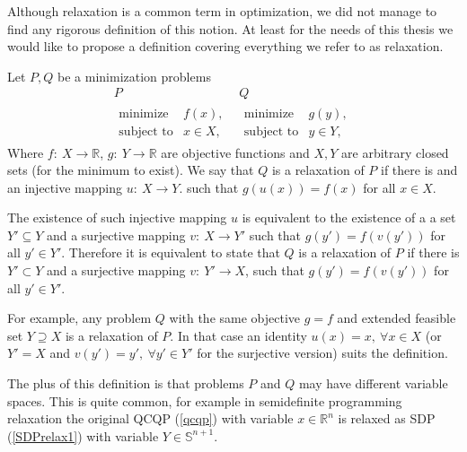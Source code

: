 \documentclass[12pt]{book}
\theoremstyle{definition}
\begin{document}

Although relaxation is a common term in optimization, we did not manage to find any rigorous definition of this notion. At least for the needs of this thesis we would like to propose a definition covering everything we refer to as relaxation.


 Let $P, Q$ be a minimization problems
\label{defRelaxationProposed}
\begin{equation}
\begin{array}{cc}
 P & Q \\
\begin{array}{ll}
\mbox{minimize} & f(x), \\
\mbox{subject to} & x\in X,
\end{array} 
&
\begin{array}{ll}
\mbox{minimize} & g(y), \\
\mbox{subject to} & y\in Y,
\end{array} 
\end{array}
\end{equation}
Where $f:\ X\rightarrow \mathbb{R}$, $g:\ Y\rightarrow \mathbb{R}$ are objective functions and $X,Y$ are arbitrary closed sets (for the minimum to exist).
We say that $Q$ is a relaxation of $P$ if there is and an injective mapping $u:\ X\rightarrow Y$. such that $g(u(x)) =  f(x)$ for all $x \in X$.



\rem The existence of such injective mapping $u$ is equivalent to the existence of a a set $Y'\subseteq Y$ and a surjective mapping $v:\ X\rightarrow Y'$ such that  $g(y') = f(v(y'))$ for all $y'\in Y'$. Therefore it is equivalent to state that $Q$ is a relaxation of $P$ if there is $Y'\subset Y$ and a surjective mapping $v:\ Y'\rightarrow X$, such that $g(y') = f(v(y'))$ for all $y'\in Y'$.


For example, any problem $Q$ with the same objective $g=f$ and extended feasible set $Y\supseteq X$ 
is a relaxation of $P$. In that case an identity $u(x) = x, \ \forall x\in X$ (or $Y'=X$ and $v(y') = y',\ \forall y'\in Y'$ for the surjective version) suits the definition. 

The plus of this definition is that problems $P$ and $Q$ may have different variable spaces. This is quite common, for example in semidefinite programming relaxation the original QCQP (\ref{qcqp}) with variable $x\in \mathbb{R}^n$ is relaxed as SDP (\ref{SDPrelax1}) with variable $Y\in\mathbb{S}^{n+1}$. 
 
\end{document}
